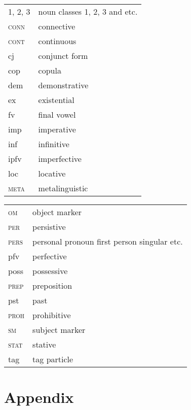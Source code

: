 \documentclass[output=paper]{langsci/langscibook}
\begin{document}
\noindent%
\begin{minipage}{\textwidth}
    \begin{tabularx}{.5\textwidth}[t]{@{} l Q }
1, 2, 3 & noun classes 1, 2, 3 and etc.\\ 
\textsc{conn}   & connective\\
\textsc{cont} & continuous\\
{\sc cj}&	conjunct form\\
{\sc cop}&	copula\\
{\sc dem}&	demonstrative\\
{\sc ex}&	existential\\
{\sc fv}&	final vowel\\
{\sc imp}&	imperative\\
{\sc inf}&	infinitive\\
{\sc ipfv}&	imperfective\\
{\sc loc}&	locative\\
\textsc{meta} & metalinguistic\\ 
\end{tabularx}
\begin{tabularx}{.5\textwidth}[t]{ l Q @{}}
\textsc{om}&object marker\\
\textsc{per}    &persistive\\
\textsc{pers}   &personal pronoun first person singular etc.\\
{\sc pfv}&	perfective\\
{\sc poss}&	possessive\\
\textsc{prep}&	preposition\\
{\sc pst}&	past\\
\textsc{proh}&		prohibitive\\
\textsc{sm}&	subject marker\\
\textsc{stat}   &stative\\
{\sc tag}&	tag particle\\
\end{tabularx}
\end{minipage}

\section*{Appendix}
\end{document}
